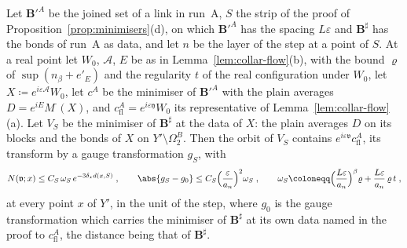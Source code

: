 
\begin{lemma}\label{lem:strip}
Let $\mathbf B'^A$ be the joined set of a link in run~A, $S$ the strip of the proof of Proposition~\ref{prop:minimisers}(d), on which $\mathbf B'^A$ has the spacing $L\varepsilon$ and $\mathbf B^\sharp$ has the bonds of run~A as data, and let $n$ be the layer of the step at a point of $S$. At a real point let $W_0$, $\mathcal A$, $E$ be as in Lemma~\ref{lem:collar-flow}(b), with the bound $\varrho$ of $\sup(n_\beta + e'_E)$ and the regularity $t$ of the real configuration under $W_0$, let $X \coloneqq e^{i\varepsilon\mathcal A}W_0$, let $c^A$ be the minimiser of $\mathbf B'^A$ with the plain averages $D = e^{iE}M^\cdot(X)$, and $c^A_{\mathrm{fl}} = e^{i\varepsilon\mathfrak y}W_0$ its representative of Lemma~\ref{lem:collar-flow}(a). Let $V_S$ be the minimiser of $\mathbf B^\sharp$ at the data of $X$: the plain averages $D$ on its blocks and the bonds of $X$ on $Y' \setminus \Omega^B_2$. Then the orbit of $V_S$ contains $e^{i\varepsilon\mathfrak v}c^A_{\mathrm{fl}}$, its transform by a gauge transformation $g_S$, with
\[
    N(\mathfrak v; x) \leq C_S\,\omega_S\,e^{-3\delta_\star d(x,S)}\;,
    \qquad
    \abs{g_S - g_0} \leq C_S\Bigl(\frac{\varepsilon}{a_n}\Bigr)^2\omega_S\;,
    \qquad
    \omega_S \coloneqq \Bigl(\frac{L\varepsilon}{a_n}\Bigr)^\beta\varrho + \frac{L\varepsilon}{a_n}\,\varrho\,t\;,
\]
at every point $x$ of $Y'$, in the unit of the step, where $g_0$ is the gauge transformation which carries the minimiser of $\mathbf B^\sharp$ at its own data named in the proof to $c^A_{\mathrm{fl}}$, the distance being that of $\mathbf B^\sharp$.
\end{lemma}

